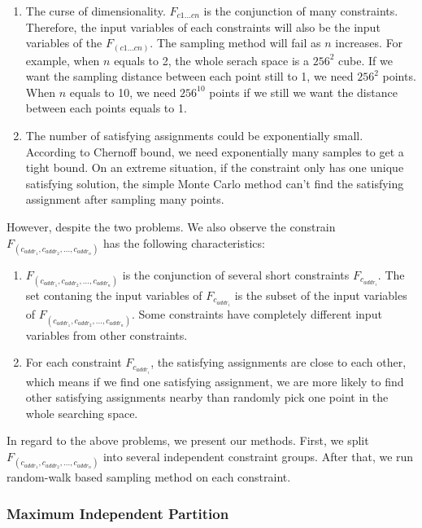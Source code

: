 \begin{enumerate}
      \item The curse of dimensionality. $F_{c1...cn}$ is the conjunction of many
      constraints. Therefore, the input variables of each constraints will also be 
      the input variables of the $F_(c1...cn)$. The sampling method will fail as 
      $n$ increases. For example, when $n$ equals to 2, the whole serach space is 
      a $256^2$ cube. If we want the sampling distance between each point still to 1,
      we need $256^2$ points. When $n$ equals to 10, we need $256^{10}$ points if we 
      still we want the distance between each points equals to 1. 

      \item The number of satisfying assignments could be exponentially small.
      According to Chernoff bound, we need exponentially many samples to get 
      a tight bound. On an extreme situation, if the constraint only has one unique
      satisfying solution, the simple Monte Carlo method can't find the satisfying
      assignment after sampling many points.
\end{enumerate}

However, despite the two problems. We also observe the constrain $F_(c_{addr_1},c_{addr_2},...,c_{addr_n})$
has the following characteristics:
\begin{enumerate}
      \item $F_(c_{addr_1},c_{addr_2},...,c_{addr_n})$ is the conjunction of several
      short constraints $F_{c_{{addr}_i}}$. The set contaning the input variables of 
      $F_{c_{{addr}_i}}$ is the subset of the input variables of $F_(c_{addr_1},c_{addr_2},...,c_{addr_n})$.
      Some constraints have completely different input variables from other constraints.
      \item For each constraint $F_{c_{{addr}_i}}$, the satisfying assignments
      are close to each other, which means if we find one satisfying assignment, we 
      are more likely to find other satisfying assignments nearby than randomly
      pick one point in the whole searching space.
      
\end{enumerate}

In regard to the above problems, we present our methods. First, we split 
$F_(c_{addr_1},c_{addr_2},...,c_{addr_n})$ into several independent constraint groups. After
that, we run random-walk based sampling method on each constraint.

\subsubsection{Maximum Independent Partition}

